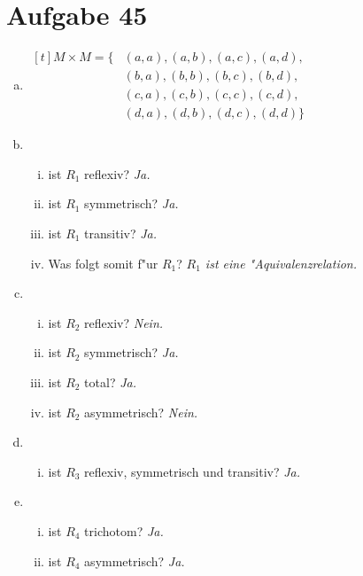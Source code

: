 \documentclass[10pt, oneside]{article}
\begin{document}
\section{Aufgabe 45}

\begin{enumerate}[(a)]
    \item $\begin{aligned}[t]
            M \times M = \{&(a, a), (a, b), (a, c), (a, d), \\
                           &(b, a), (b, b), (b, c), (b, d), \\
                           &(c, a), (c, b), (c, c), (c, d), \\
                           &(d, a), (d, b), (d, c), (d, d)\}
           \end{aligned}$
    \item
        \begin{enumerate}[i)]
            \item ist $R_1$ reflexiv? \textit{Ja.}
            \item ist $R_1$ symmetrisch? \textit{Ja.}
            \item ist $R_1$ transitiv? \textit{Ja.}
            \item Was folgt somit f"ur $R_1$? \textit{$R_1$ ist eine "Aquivalenzrelation.}
        \end{enumerate}
    \item
        \begin{enumerate}[i)]
            \item ist $R_2$ reflexiv? \textit{Nein.}
            \item ist $R_2$ symmetrisch? \textit{Ja.}
            \item ist $R_2$ total? \textit{Ja.}
            \item ist $R_2$ asymmetrisch? \textit{Nein.}
        \end{enumerate}
    \item
        \begin{enumerate}[i)]
            \item ist $R_3$ reflexiv, symmetrisch und transitiv? \textit{Ja.}
        \end{enumerate}
    \item
        \begin{enumerate}[i)]
            \item ist $R_4$ trichotom? \textit{Ja.}
            \item ist $R_4$ asymmetrisch? \textit{Ja.}
        \end{enumerate}

\end{enumerate}
\end{document}
